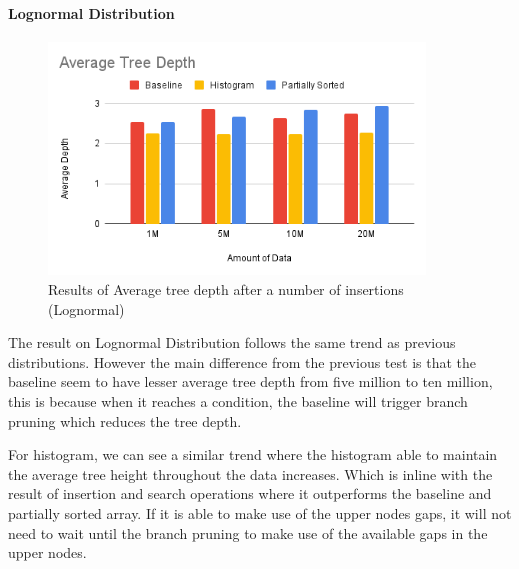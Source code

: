 \documentclass[11pt,a4paper]{article}
\begin{document}
\paragraph{Lognormal Distribution}
\begin{figure}
    \centering
    \includegraphics[width=100mm,scale=1]{Figures/AVGTD-Log.png}
    \caption{
     Results of Average tree depth after a number of insertions (Lognormal)
    }
    \label{fig:AverageTreeDepthLog}
\end{figure}
The result on Lognormal Distribution follows the same trend as previous distributions. However the main difference from the previous test is that the baseline seem to have lesser average tree depth from five million to ten million, this is because when it reaches a condition, the baseline will trigger branch pruning which reduces the tree depth. 

For histogram, we can see a similar trend where the histogram able to maintain the average tree height throughout the data increases. Which is inline with the result of insertion and search operations where it outperforms the baseline and partially sorted array. If it is able to make use of the upper nodes gaps, it will not need to wait until the branch pruning to make use of the available gaps in the upper nodes. 
\end{document}

